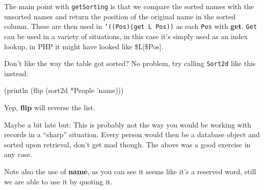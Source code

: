 The main point with \texttt{getSorting} is that we compare the sorted
names with the unsorted names and return the position of the original
name in the sorted column. These are then used in \texttt{'((Pos)(get
  L Pos))} as each \texttt{Pos} with \textbf{get}. \texttt{Get} can be
used in a variety of situations, in this case it's simply used as an
index lookup, in PHP it might have looked like \$L[\$Pos].

Don't like the way the table got sorted? No problem, try calling
\texttt{Sort2d} like this instead:


\begin{wideverbatim}
(println (flip (sort2d *People 'name)))
\end{wideverbatim}

Yep, \textbf{flip} will reverse the list.

Maybe a bit late but: This is probably not the way you would be working
with records in a ``sharp'' situation. Every person would then be a
database object and sorted upon retrieval, don't get mad though. The
above was a good exercise in any case.

Note also the use of \textbf{name}, as you can see it seems like it's a
reserved word, still we are able to use it by quoting it.

